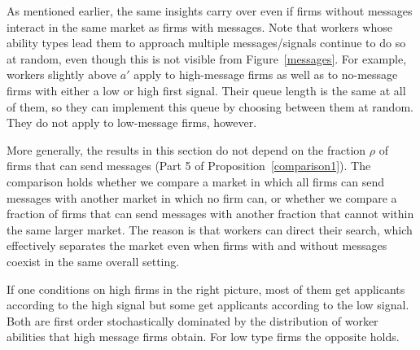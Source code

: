 \documentclass[12pt]{article}
\begin{document}
As mentioned earlier, the same insights carry over even if firms without messages interact in the same market as firms with messages. Note that workers whose ability types lead them to approach multiple messages/signals continue to do so at random, even though this is not visible from Figure~\ref{messages}. For example, workers slightly above $a'$ apply to high-message firms as well as to no-message firms with either a low or high first signal. Their queue length is the same at all of them, so they can implement this queue by choosing between them at random. They do not apply to low-message firms, however.

More generally, the results in this section do not depend on the fraction $\rho$ of firms that can send messages (Part 5 of Proposition~\ref{comparison1}). The comparison holds whether we compare a market in which all firms can send messages with another market in which no firm can, or whether we compare a fraction of firms that can send messages with another fraction that cannot within the same larger market. The reason is that workers can direct their search, which effectively separates the market even when firms with and without messages coexist in the same overall setting.

If one conditions on high firms in the right picture, most of them get
applicants according to the high signal but some get applicants according to
the low signal. Both are first order stochastically dominated by the
distribution of worker abilities that high message firms obtain. For low
type firms the opposite holds.

\end{document}

